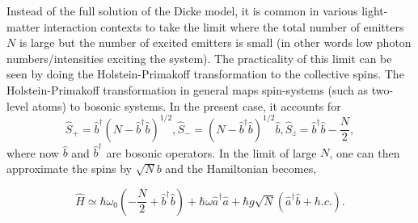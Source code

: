 \documentclass[12pt]{iopart}
\begin{document}
Instead of the full solution of the Dicke model, it is common in various light-matter interaction contexts to take the limit where the total number of emitters $N$ is large but the number of excited emitters is small (in other words low photon numbers/intensities exciting the system). The practicality of this limit can be seen by doing the Holstein-Primakoff transformation to the collective spins. The Holstein-Primakoff transformation in general maps spin-systems (such as two-level atoms) to bosonic systems. In the present case, it accounts for 
\begin{equation}
\hat{S}_{+} = \hat{b}^\dagger (N - \hat{b}^\dagger \hat{b})^{1/2},\hat{S}_{-} = (N - \hat{b}^\dagger \hat{b})^{1/2} \hat{b} , 
\hat{S}_{z} = \hat{b}^\dagger \hat{b} - \frac{N}{2},  
\end{equation}
where now $\hat{b}$ and $\hat{b}^\dagger$ are bosonic operators. In the limit of large $N$, one can then approximate the spins by $\sqrt{N} b$ and the Hamiltonian becomes,

\begin{equation}
\hat{H}\simeq \hbar\omega_{0}\left(- \frac{N}{2}+\hat{b}^\dagger \hat{b}\right) + \hbar\omega\hat{a}^{\dagger}
\hat{a}+\hbar g \sqrt{N} \left(\hat{a}^\dagger\hat{b}+h.c.\right)  .
\end{equation}
\end{document}
